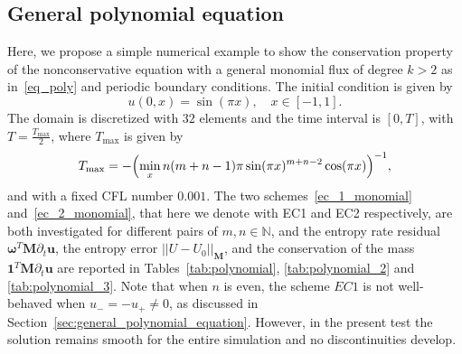 \documentclass[]{scrartcl}
\newcommand{\mtx}[1]{\boldsymbol{#1}}
\renewcommand{\vec}[1]{\boldsymbol{#1}}
\theoremstyle{definition}
\begin{document}
\subsection{General polynomial equation}
Here, we propose a simple numerical example to show the conservation property of the nonconservative equation with a general monomial flux of degree $k > 2$ as in~\eqref{eq_poly} and periodic boundary conditions. The initial condition is given by
\begin{equation}
u(0, x) = \sin(\pi x), \quad x \in [-1, 1].
\end{equation}
The domain is discretized with $32$ elements and the time interval is $[0, T]$, with $T = \frac{T_{\text{max}}}{2}$, where $T_{\text{max}}$ is given by~\cite{ranocha2018generalised}
\begin{equation}\label{tmax}
    T_{\text{max}} = -\Bigl (\min_{x} n(m+n-1) \pi \sin(\pi x)^{m+n-2} \cos(\pi x) \Bigr  )^{-1},
\end{equation}
and with a fixed CFL number $0.001$.
The two schemes~\eqref{ec_1_monomial} and~\eqref{ec_2_monomial}, that here we denote with EC1 and EC2 respectively, are both investigated for different pairs of $m, n \in \mathbb{N}$, and the entropy rate residual $\vec{\omega}^T \mtx{M} \partial_t \vec{u}$, the entropy error $||U - U_0||_{\mtx{M}}$, and the conservation of the mass $\vec{1}^T \mtx{M} \partial_t \vec{u}$ are reported in Tables~\ref{tab:polynomial}, \ref{tab:polynomial_2} and \ref{tab:polynomial_3}.
Note that when $n$ is even, the scheme $EC1$ is not well-behaved when $u_- = -u_+ \neq 0$, as discussed in Section~\ref{sec:general_polynomial_equation}. However, in the present test the solution remains smooth for the entire simulation and no discontinuities develop.
\end{document}
